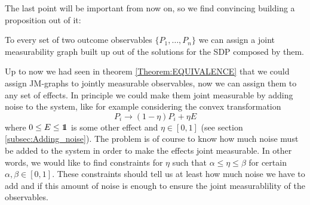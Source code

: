 \documentclass[10pt, a4paper]{amsart}
\begin{document}
The last point will be important from now on, so we find convincing building a proposition out of it:
\begin{proposition}\label{proposition:EFFECTS_GRAPHS_JMG}
To every set of two outcome observables $\{P_{1}, \ldots, P_{n}\}$ we can assign a joint measurability graph built up out of the solutions for the SDP composed by them. 
\end{proposition}
Up to now we had seen in theorem \ref{Theorem:EQUIVALENCE} that we could assign JM-graphs to jointly measurable observables, now we can assign them to any set of effects. In principle we could make them joint measurable by adding noise to the system, like for example considering the convex transformation 
$$P_{i}\to (1-\eta) P_{i} +\eta E$$
where $0\leq E\leq \bbone$ is some other effect and $\eta \in [0,1]$ (see section \ref{subsec:Adding_noise}). The problem is of course to know how much noise must be 
added to the system in order to make the effects joint measurable. In other words, we would like to find constraints for $\eta$ such that $\alpha \leq \eta \leq \beta$ for certain $\alpha , \beta \in [0,1]$. These constraints should tell us at least how much noise we have to add and if this amount of noise is enough to ensure the joint measurablility of the observables. \\
\end{document}
